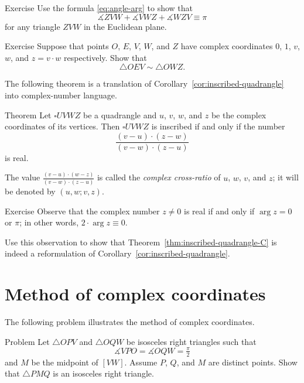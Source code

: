 \begin{thm}{Exercise}\label{ex:3-sum-C}
Use the formula \ref{eq:angle-arg} to show that  
$$\measuredangle ZVW+\measuredangle VWZ+\measuredangle WZV\equiv \pi$$
for any triangle $ZVW$ in the Euclidean plane.
\end{thm}

\begin{thm}{Exercise}\label{ex:C-sim}
Suppose that points $O$, $E$, $V$, $W$, and $Z$ have complex coordinates $0$, $1$, $v$, $w$, and $z=v\cdot w$ respectively.
Show that 
\[\triangle OEV\sim \triangle OWZ.\]

\end{thm}

The following theorem is a translation of Corollary~\ref{cor:inscribed-quadrangle} into complex-number language.

\begin{thm}{Theorem}\label{thm:inscribed-quadrangle-C}
Let $\square UVWZ$ be a quadrangle and $u$, $v$, $w$, and $z$ be the complex coordinates of its vertices. 
Then $\square UVWZ$ is inscribed 
if and only if the number
$$\frac{(v-u)\cdot(z-w)}{(v-w)\cdot(z-u)}$$ 
is real.
\end{thm}

The value $\frac{(v-u)\cdot(w-z)}{(v-w)\cdot(z-u)}$ is called the 
\emph{complex cross-ratio} of $u$, $w$, $v$, and $z$; 
it will be denoted by $(u,w;v,z)$.



\begin{thm}{Exercise}\label{ex:real-cross-ratio}
Observe that the complex number $z\ne 0$ is real if and only if $\arg z=0$ or $\pi$;
in other words, $2\cdot\arg z\equiv 0$.

Use this observation to show that Theorem~\ref{thm:inscribed-quadrangle-C}
is indeed a reformulation of Corollary~\ref{cor:inscribed-quadrangle}.
\end{thm}

\section{Method of complex coordinates}

The following problem illustrates the method of complex coordinates.

\begin{thm}{Problem}\label{prob:2right-tringles}
Let $\triangle OPV$ and $\triangle OQW$ be isosceles right triangles such that 
\[\measuredangle VPO=\measuredangle OQW=\tfrac\pi2\] 
and $M$ be the midpoint of $[VW]$.
Assume $P$, $Q$, and $M$ are distinct points.
Show that  $\triangle PMQ$ is an isosceles right triangle.
\end{thm}

